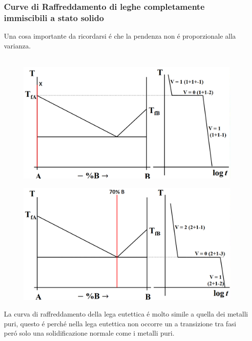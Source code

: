 \documentclass{article}
\begin{document}
{            \subsubsection{Curve di Raffreddamento di leghe completamente immiscibili a stato solido}
                Una cosa importante da ricordarsi \'e che la pendenza non \'e proporzionale alla varianza.\\ \\
                \begin{figure}[ht]
                    \centering
                    \includegraphics[width=.85\linewidth]{Esempio di curve di raffreddamento di una soluzione di metallo puro in un sistema completamente immiscibile.png}
                \end{figure}
                \begin{figure}[ht]
                    \centering
                    \includegraphics[width=.85\linewidth]{Curva di Raffreddamento per una lega eutettica esemplare.png}
                \end{figure}
                La curva di raffreddamento della lega eutettica \'e molto simile a quella dei metalli puri, questo \'e perch\'e nella lega eutettica non occorre un a transizione tra fasi per\'o solo una solidificazione normale come i metalli puri.
                \begin{figure}[!h]

\end{figure}}
\end{document}
